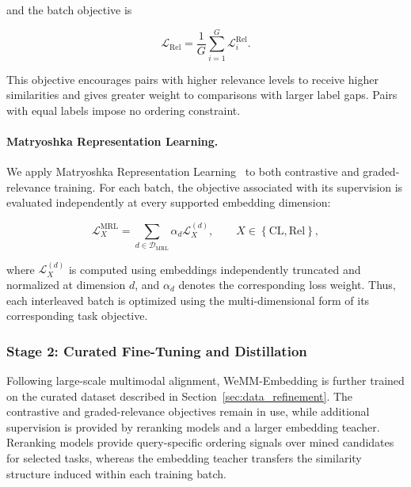 \documentclass[]{wechat}
\begin{document}
and the batch objective is

\begin{equation}
    \mathcal{L}_{\mathrm{Rel}}
    =
    \frac{1}{G}
    \sum_{i=1}^{G}
    \mathcal{L}_{i}^{\mathrm{Rel}}.
    \label{eq:relevance_ranking_loss}
\end{equation}














This objective encourages pairs with higher relevance levels to receive higher similarities and gives greater weight to comparisons with larger label gaps. Pairs with equal labels impose no ordering constraint.

\paragraph{Matryoshka Representation Learning.}

We apply Matryoshka Representation Learning~\cite{MRL2022} to both contrastive and graded-relevance training. For each batch, the objective associated with its supervision is evaluated independently at every supported embedding dimension:

\begin{equation}
    \mathcal{L}_{X}^{\mathrm{MRL}}
    =
    \sum_{d\in\mathcal{D}_{\mathrm{MRL}}}
    \alpha_d
    \mathcal{L}_{X}^{(d)},
    \qquad
    X\in
    \left\{
        \mathrm{CL},
        \mathrm{Rel}
    \right\},
    \label{eq:stage1_mrl_objective}
\end{equation}

where $\mathcal{L}_{X}^{(d)}$ is computed using embeddings independently truncated and normalized at dimension $d$, and $\alpha_d$ denotes the corresponding loss weight. Thus, each interleaved batch is optimized using the multi-dimensional form of its corresponding task objective.





\subsubsection{Stage 2: Curated Fine-Tuning and Distillation}
\label{sec:stage2_training}

Following large-scale multimodal alignment, WeMM-Embedding is further trained on the curated dataset described in Section~\ref{sec:data_refinement}. The contrastive and graded-relevance objectives remain in use, while additional supervision is provided by reranking models and a larger embedding teacher. Reranking models provide query-specific ordering signals over mined candidates for selected tasks, whereas the embedding teacher transfers the similarity structure induced within each training batch.
\end{document}
